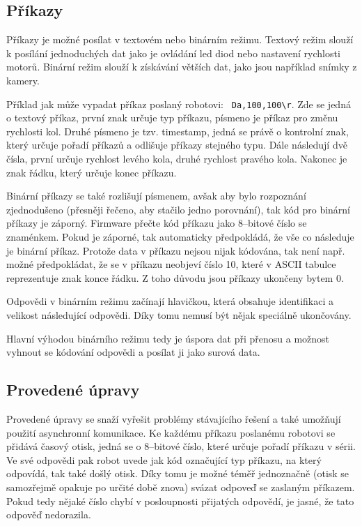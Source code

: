     \subsection{Příkazy}
    \label{btcom:prikazy}

    Příkazy je možné posílat v textovém nebo binárním režimu. Textový režim
    slouží k posílání jednoduchých dat jako je ovládání led diod nebo nastavení
    rychlosti motorů. Binární režim slouží k získávání větších dat, jako jsou
    například snímky z kamery.

    Příklad jak může vypadat příkaz poslaný robotovi: {\tt
    Da,100,100\textbackslash r}. Zde se jedná o textový příkaz, první znak
    určuje typ příkazu, písmeno  je příkaz pro změnu rychlosti kol. Druhé
    písmeno je tzv. timestamp, jedná se právě o kontrolní znak, který určuje
    pořadí příkazů a odlišuje příkazy stejného typu. Dále následují dvě čísla,
    první určuje rychlost levého kola, druhé rychlost pravého kola. Nakonec je
    znak řádku, který určuje konec příkazu.

    Binární příkazy se také rozlišují písmenem, avšak aby bylo rozpoznání
    zjednodušeno (přesněji řečeno, aby stačilo jedno porovnání), tak kód pro
    binární příkazy je záporný. Firmware přečte kód příkazu jako 8--bitové
    číslo se znaménkem. Pokud je záporné, tak automaticky předpokládá, že vše
    co následuje je binární příkaz. Protože data v příkazu nejsou nijak
    kódována, tak není např. možné předpokládat, že se v příkazu neobjeví číslo
    10, které v ASCII tabulce reprezentuje znak konce řádku. Z toho důvodu jsou
    příkazy ukončeny bytem 0.

    Odpovědi v binárním režimu začínají hlavičkou, která obsahuje identifikaci
    a velikost následující odpovědi. Díky tomu nemusí být nějak speciálně
    ukončovány.

    Hlavní výhodou binárního režimu tedy je úspora dat při přenosu a možnost
    vyhnout se kódování odpovědi a posílat ji jako surová data.

    \subsection{Provedené úpravy}
    \label{btcom:upravy}

    Provedené úpravy se snaží vyřešit problémy stávajícího řešení a také
    umožňují použití asynchronní komunikace. Ke každému příkazu poslanému
    robotovi se přidává časový otisk, jedná se o 8--bitové číslo, které určuje
    pořadí příkazu v sérii. Ve své odpovědi pak robot uvede jak kód označující
    typ příkazu, na který odpovídá, tak také došlý otisk. Díky tomu je možné
    téměř jednoznačně (otisk se samozřejmě opakuje po určité době znova) svázat
    odpoveď se zaslaným příkazem. Pokud tedy nějaké číslo chybí v posloupnosti
    přijatých odpovědí, je jasné, že tato odpověď nedorazila.

